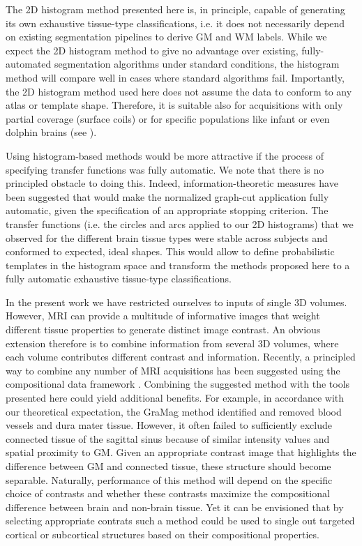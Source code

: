 The 2D histogram method presented here is, in principle, capable of generating its own exhaustive tissue-type classifications, i.e. it does not necessarily depend on existing segmentation pipelines to derive GM and WM labels. While we expect the 2D histogram method to give no advantage over existing, fully-automated segmentation algorithms under standard conditions, the histogram method will compare well in cases where standard algorithms fail. Importantly, the 2D histogram method used here does not assume the data to conform to any atlas or template shape. Therefore, it is suitable also for acquisitions with only partial coverage (surface coils) or for specific populations like infant or even dolphin brains (see ).

Using histogram-based methods would be more attractive if the process of specifying transfer functions was fully automatic. We note that there is no principled obstacle to doing this. Indeed, information-theoretic measures have been suggested \parencite{Ip2012} that would make the normalized graph-cut application fully automatic, given the specification of an appropriate stopping criterion. The transfer functions (i.e. the circles and arcs applied to our 2D histograms) that we observed for the different brain tissue types were stable across subjects and conformed to expected, ideal shapes. This would allow to define probabilistic templates in the histogram space and transform the methods proposed here to a fully automatic exhaustive tissue-type classifications.

In the present work we have restricted ourselves to inputs of single 3D volumes. However, MRI can provide a multitude of informative images that weight different tissue properties to generate distinct image contrast. An obvious extension therefore is to combine information from several 3D volumes, where each volume contributes different contrast and information. Recently, a principled way to combine any number of MRI acquisitions has been suggested using the compositional data framework \parencite{Gulban2018c}. Combining the suggested method with the tools presented here could yield additional benefits. For example, in accordance with our theoretical expectation, the GraMag method identified and removed blood vessels and dura mater tissue. However, it often failed to sufficiently exclude connected tissue of the sagittal sinus because of similar intensity values and spatial proximity to GM. 
Given an appropriate contrast image that highlights the difference between GM and connected tissue, these structure should become separable. Naturally, performance of this method will depend on the specific choice of contrasts and whether these contrasts maximize the compositional difference between brain and non-brain tissue. Yet it can be envisioned that by selecting appropriate contrats such a method could be used to single out targeted cortical or subcortical structures based on their compositional properties.

